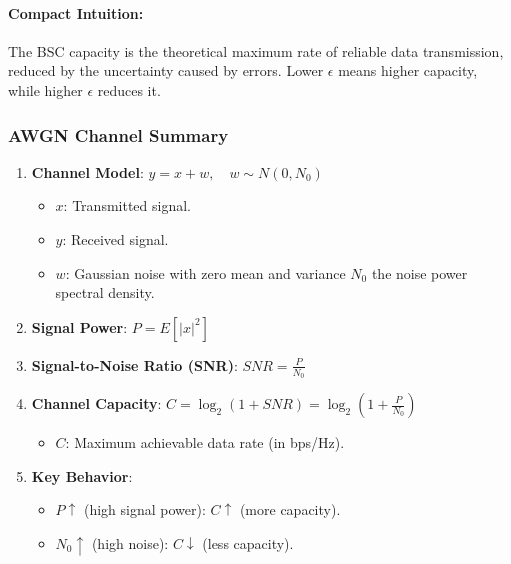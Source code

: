 \documentclass[11pt]{article}
\providecommand{\tightlist}{%
      \setlength{\itemsep}{0pt}\setlength{\parskip}{0pt}}
\begin{document}
\paragraph{Compact Intuition:}\label{compact-intuition}

The BSC capacity is the theoretical maximum rate of reliable data
transmission, reduced by the uncertainty caused by errors. Lower
\(\epsilon\) means higher capacity, while higher \(\epsilon\) reduces
it.

    \subsubsection{AWGN Channel Summary}\label{awgn-channel-summary}

\begin{enumerate}
\def\labelenumi{\arabic{enumi}.}
\item
  \textbf{Channel Model}: \(\boxed{y = x + w, \quad w \sim N(0, N_0)}\)

  \begin{itemize}
  \tightlist
  \item
    \(x\): Transmitted signal.
  \item
    \(y\): Received signal.
  \item
    \(w\): Gaussian noise with zero mean and variance \(N_0\) the noise
    power spectral density.
  \end{itemize}
\item
  \textbf{Signal Power}: \(\boxed{P = E[|x|^2]}\)
\item
  \textbf{Signal-to-Noise Ratio (SNR)}: \(\boxed{SNR = \frac{P}{N_0}}\)
\item
  \textbf{Channel Capacity}:
  \(\boxed{C = \log_2\left(1 + SNR\right) = \log_2\left(1 + \frac{P}{N_0}\right)}\)

  \begin{itemize}
  \tightlist
  \item
    \(C\): Maximum achievable data rate (in bps/Hz).
  \end{itemize}
\item
  \textbf{Key Behavior}:

  \begin{itemize}
  \tightlist
  \item
    \(P \uparrow\) (high signal power): \(C \uparrow\) (more capacity).
  \item
    \(N_0 \uparrow\) (high noise): \(C \downarrow\) (less capacity).
  \end{itemize}
\end{enumerate}
\end{document}
